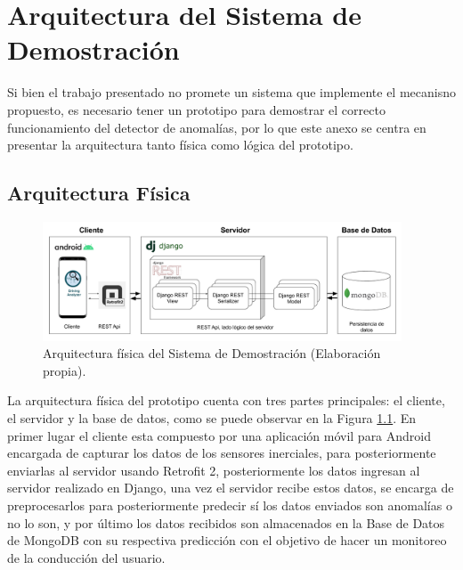  

\chapter{Arquitectura del Sistema de Demostraci\'{o}n} %

\label{chapter:AppendixB} %

Si bien el trabajo presentado no promete un sistema que implemente el mecanisno propuesto, es necesario tener un prototipo para demostrar el correcto funcionamiento del detector de anomal\'{i}as, por lo que este anexo se centra en presentar la arquitectura tanto f\'{i}sica como l\'{o}gica del prototipo.

\section{Arquitectura F\'{i}sica}

\begin{figure}[h!]
  \begin{center}	\includegraphics[width=0.95\textwidth, fbox]{imagenes/Apendices/Arquitectura}
  \caption{Arquitectura f\'{i}sica del Sistema de Demostraci\'{o}n (Elaboraci\'{o}n propia).}
  \label{fig:arq_fis}  
  \end{center}
\end{figure}

La arquitectura f\'{i}sica del prototipo cuenta con tres partes principales: el cliente, el servidor y la base de datos, como se puede observar en la Figura \ref{fig:arq_fis}. En primer lugar el cliente esta compuesto por una aplicaci\'{o}n m\'{o}vil para Android encargada de capturar los datos de los sensores inerciales, para posteriormente enviarlas al servidor usando Retrofit 2, posteriormente los datos ingresan al servidor realizado en Django, una vez el servidor recibe estos datos, se encarga de preprocesarlos para posteriormente predecir s\'{i} los datos enviados son anomal\'{i}as o no lo son, y por \'{u}ltimo los datos recibidos son almacenados en la Base de Datos de MongoDB con su respectiva predicci\'{o}n con el objetivo de hacer un monitoreo de la conducci\'{o}n del usuario.

